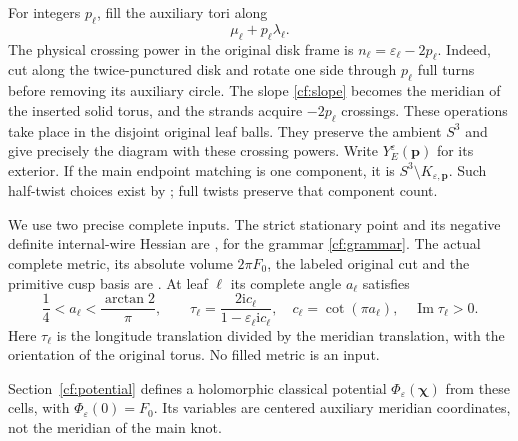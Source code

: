 \documentclass[11pt]{article}
\numberwithin{equation}{section}
\theoremstyle{definition}\newtheorem{definition}[theorem]{Definition}
\theoremstyle{remark}\newtheorem{remark}[theorem]{Remark}
\newcommand{\ii}{\mathrm i}
\newcommand{\Ima}{\operatorname{Im}}
\newcommand{\eps}{\varepsilon}
\begin{document}
For integers $p_\ell$, fill the auxiliary tori along
\begin{equation}\label{cf:slope}
       \mu_\ell+p_\ell\lambda_\ell .
\end{equation}
The physical crossing power in the original disk frame is
$n_\ell=\eps_\ell-2p_\ell$.
Indeed, cut along the twice-punctured disk and rotate one side
through $p_\ell$ full turns before removing its auxiliary circle.
The slope \eqref{cf:slope} becomes the meridian of the inserted
solid torus, and the strands acquire $-2p_\ell$ crossings.
These operations take place in the disjoint original leaf balls.
They preserve the ambient $S^3$ and give precisely the diagram
with these crossing powers. Write $Y^\eps_E(\mathbf p)$ for
its exterior. If the main endpoint matching is one component,
it is $S^3\setminus K_{\eps,\mathbf p}$.
Such half-twist choices exist by \cite[Proposition~8.1]{Geometry};
full twists preserve that component count.

We use two precise complete inputs. The strict stationary point
and its negative definite internal-wire Hessian are
\cite[Proposition~5.3]{Newton}, for the grammar \eqref{cf:grammar}.
The actual complete metric, its absolute volume $2\pi F_0$,
the labeled original cut and the primitive cusp basis are
\cite[Theorem~1.2 and Section~7]{Geometry}. At leaf $\ell$ its
complete angle $a_\ell$ satisfies
\begin{equation}\label{cf:cusp}
 \frac14<a_\ell<\frac{\arctan2}{\pi},\qquad
 \tau_\ell=\frac{2\ii c_\ell}{1-\eps_\ell\ii c_\ell},
 \quad c_\ell=\cot(\pi a_\ell),\quad \Ima\tau_\ell>0.
\end{equation}
Here $\tau_\ell$ is the longitude translation divided by the
meridian translation, with the orientation of the original torus.
No filled metric is an input.

Section~\ref{cf:potential} defines a holomorphic classical
potential $\Phi_\eps(\boldsymbol\chi)$ from these cells, with
$\Phi_\eps(0)=F_0$. Its variables are centered auxiliary
meridian coordinates, not the meridian of the main knot.
\end{document}
